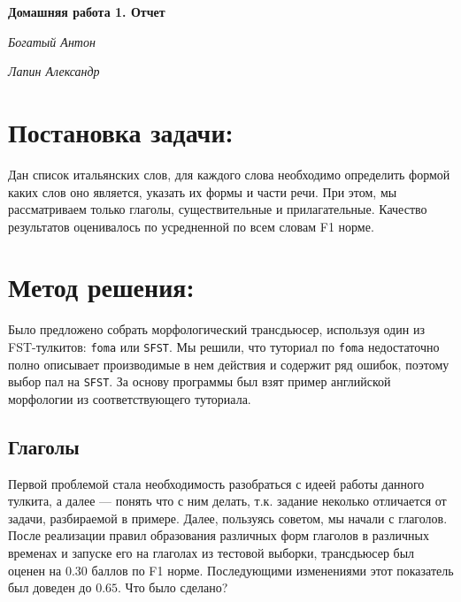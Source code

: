 \documentclass[12pt,a4paper]{article}
\begin{document}
\newcommand{\parw}[2]{\dfrac{\partial #1}{\partial #2}}
\newcommand{\pl}{p_{\lambda}}
\newcommand{\pa}{p_{a}}
\newcommand{\pgm}{p_{m, \sigma^2}}
\newcommand{\pma}{p_{M, a}}
\newcommand{\xseqn}{x_1, \ldots, x_n}
\renewcommand{\le}{\leqslant}


\newcommand*{\hm}[1]{#1\nobreak\discretionary{}%
{\hbox{$\mathsurround=0pt #1$}}{}}

\begin{center}
\textbf{Домашняя работа 1. Отчет}
\end{center}

\begin{flushright}
\textit{Богатый Антон}

\textit{Лапин Александр}
\end{flushright}


\section{Постановка задачи:}
\indent\indent
Дан список итальянских слов, для каждого слова необходимо определить формой каких слов оно является, указать их формы и части речи. При этом, мы рассматриваем только глаголы, существительные и прилагательные. Качество результатов оценивалось по усредненной по всем словам F1 норме.
\bigskip

\section{Метод решения:}
\indent\indent
Было предложено собрать морфологический трансдьюсер, используя один из FST-тулкитов: \texttt{foma} или \texttt{SFST}.
Мы решили, что туториал по \texttt{foma} недостаточно полно описывает производимые в нем действия и содержит ряд ошибок, поэтому выбор пал на \texttt{SFST}. За основу программы был взят пример английской морфологии из соответствующего туториала.


\subsection{Глаголы}
Первой проблемой стала необходимость разобраться с идеей работы данного тулкита, а далее --- понять что с ним делать, т.к. задание неколько отличается от задачи, разбираемой в примере. Далее, пользуясь советом, мы начали с глаголов. После реализации правил образования различных форм глаголов в различных временах и запуске его на глаголах из тестовой выборки, трансдьюсер был оценен на $0.30$ баллов по F1 норме. Последующими изменениями этот показатель был доведен до $0.65$. Что было сделано?
\end{document}
